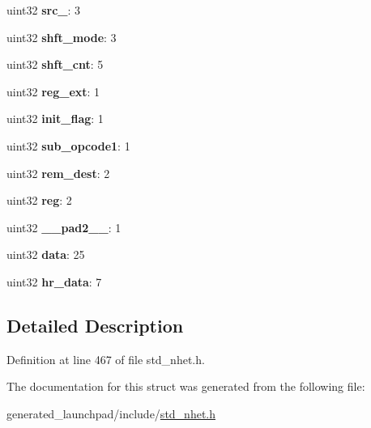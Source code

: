 \begin{DoxyCompactItemize}
\mbox{\label{structADD__format_a63cab81d371d0ae3fd7c59110117afc3}} 
uint32 {\bfseries src\+\_}\+: 3
\item 
\mbox{\label{structADD__format_a7a8ad806d505adf2f261b2708c58c287}} 
uint32 {\bfseries shft\+\_\+mode}\+: 3
\item 
\mbox{\label{structADD__format_a60bd45778edfeac46271777c0ed8a99c}} 
uint32 {\bfseries shft\+\_\+cnt}\+: 5
\item 
\mbox{\label{structADD__format_a3e611728be9787e57da9b94fa164e8a4}} 
uint32 {\bfseries reg\+\_\+ext}\+: 1
\item 
\mbox{\label{structADD__format_ab25e438b09b2881ea514b7b9fef249ce}} 
uint32 {\bfseries init\+\_\+flag}\+: 1
\item 
\mbox{\label{structADD__format_a9a863bf62de29e77625c43e1c4e49eff}} 
uint32 {\bfseries sub\+\_\+opcode1}\+: 1
\item 
\mbox{\label{structADD__format_a86462c82ada6486fe2f06652bbcfdda6}} 
uint32 {\bfseries rem\+\_\+dest}\+: 2
\item 
\mbox{\label{structADD__format_a1ecc72e677c3bfbcee39891f8e7a3c71}} 
uint32 {\bfseries reg}\+: 2
\item 
\mbox{\label{structADD__format_a899b9bf74ebe3200f39c8d9966645c07}} 
uint32 {\bfseries \+\_\+\+\_\+pad2\+\_\+\+\_\+}\+: 1
\item 
\mbox{\label{structADD__format_ac788418c1923996875102cd8a71560ce}} 
uint32 {\bfseries data}\+: 25
\item 
\mbox{\label{structADD__format_a3e2778e43049f38943961e358ac34c59}} 
uint32 {\bfseries hr\+\_\+data}\+: 7
\end{DoxyCompactItemize}


\subsection{Detailed Description}


Definition at line 467 of file std\+\_\+nhet.\+h.



The documentation for this struct was generated from the following file\+:\begin{DoxyCompactItemize}
\item 
generated\+\_\+launchpad/include/\mbox{\hyperlink{std__nhet_8h}{std\+\_\+nhet.\+h}}\end{DoxyCompactItemize}

